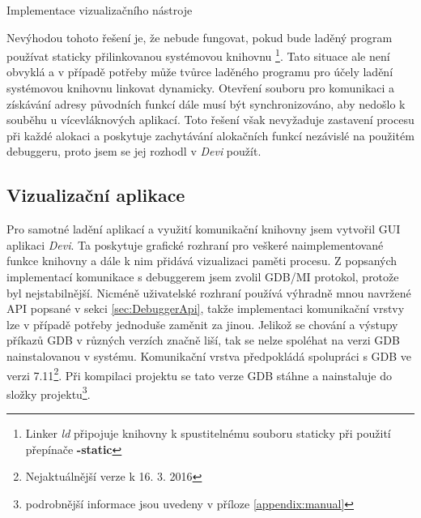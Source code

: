 \documentclass[czech,bachelor,male,python,dept460]{diploma}						%
\newcommand{\parspace}[1][]{
	\ifthenelse{\isempty{#1}}{\vspace{5mm}}{\vspace{#1}}
	\par
}
\begin{document}
\begin{section}{Implementace vizualizačního nástroje}
				\parspace Nevýhodou tohoto řešení je, že nebude fungovat, pokud bude laděný program používat staticky přilinkovanou systémovou knihovnu
				\footnote{Linker \textit{ld} připojuje knihovny k spustitelnému souboru staticky při použití přepínače \textbf{-static}}.
				Tato situace ale není obvyklá a v případě potřeby může tvůrce laděného programu pro účely ladění systémovou knihovnu linkovat dynamicky.
				Otevření souboru pro komunikaci a získávání adresy původních funkcí dále musí být synchronizováno, aby nedošlo k souběhu u vícevláknových aplikací.
				Toto řešení však nevyžaduje zastavení procesu při každé alokaci a poskytuje zachytávání alokačních funkcí nezávislé na použitém debuggeru, proto
				jsem se jej rozhodl v \textit{Devi} použít.
				
			
	\subsection{Vizualizační aplikace}
	Pro samotné ladění aplikací a využití komunikační knihovny jsem vytvořil GUI aplikaci \textit{Devi}.
	Ta poskytuje grafické rozhraní pro veškeré naimplementované funkce knihovny a dále k nim přidává vizualizaci paměti procesu.
	Z popsaných implementací komunikace s debuggerem jsem zvolil GDB/MI protokol, protože byl nejstabilnější. Nicméně uživatelské rozhraní používá výhradně
	mnou navržené API popsané v sekci \ref{sec:DebuggerApi}, takže implementaci komunikační vrstvy lze v případě potřeby jednoduše zaměnit za jinou.
	Jelikož se chování a výstupy příkazů GDB v různých verzích značně liší, tak se nelze spoléhat na verzi GDB nainstalovanou v systému.
	Komunikační vrstva předpokládá spolupráci s GDB ve verzi 7.11\footnote{Nejaktuálnější verze k 16. 3. 2016}.
	Při kompilaci projektu se tato verze GDB stáhne a nainstaluje do složky projektu\footnote{podrobnější informace jsou uvedeny v příloze \ref{appendix:manual}}.
	
	

\end{section}
\end{document}
